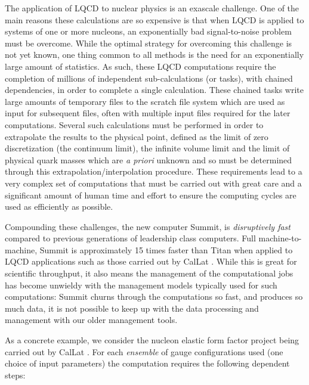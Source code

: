 The application of LQCD to nuclear physics is an exascale challenge. One
of the main reasons these calculations are so expensive is that when
LQCD is applied to systems of one or more nucleons, an exponentially bad
signal-to-noise problem must be overcome. While the optimal strategy for
overcoming this challenge is not yet known, one thing common to all
methods is the need for an exponentially large amount of statistics. As
such, these LQCD computations require the completion of millions of
independent sub-calculations (or tasks), with chained dependencies, in
order to complete a single calculation. These chained tasks write large
amounts of temporary files to the scratch file system which are used as
input for subsequent files, often with multiple input files required for
the later computations. Several such calculations must be performed in
order to extrapolate the results to the physical point, defined as the
limit of zero discretization (the continuum limit), the infinite volume
limit and the limit of physical quark masses which are \emph{a priori}
unknown and so must be determined through this
extrapolation/interpolation procedure. These requirements lead to a very
complex set of computations that must be carried out with great care and
a significant amount of human time and effort to ensure the computing
cycles are used as efficiently as possible.

Compounding these challenges, the new computer Summit, is
\emph{disruptively fast} compared to previous generations of leadership
class computers. Full machine-to-machine, Summit is approximately 15
times faster than Titan when applied to LQCD applications such as those
carried out by CalLat \cite{Berkowitz:2018gqe}. While this is great for
scientific throughput, it also means the management of the computational
jobs has become unwieldy with the management models typically used for
such computations: Summit churns through the computations so fast, and
produces so much data, it is not possible to keep up with the data
processing and management with our older management tools.

As a concrete example, we consider the nucleon elastic form factor
project being carried out by CalLat \cite{incite:2019, incite:2020}.
For each \emph{ensemble} of gauge configurations used (one choice of
input parameters) the computation requires the following dependent
steps:

